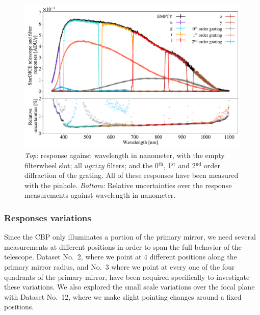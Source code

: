 \begin{figure}[h]
    \centering
    \includegraphics[width=\columnwidth]{fig/stardice_75um_response.pdf}
    \caption{\textit{Top}: \SD response against wavelength in nanometer, with the empty filterwheel slot; all $ugrizy$ filters; and the 0$^\mathrm{th}$, 1$^\mathrm{st}$ and 2$^\mathrm{nd}$ order diffraction of the grating. All of these responses have been measured with the \spinhole pinhole. \textit{Bottom:} Relative uncertainties over the \SD response measurements against wavelength in nanometer.}
    \label{fig:stardice_75um_response}
\end{figure}


\subsubsection{\SD Responses variations}

Since the CBP only illuminates a portion of the primary mirror, we need several measurements at different positions in order to span the full behavior of the \SD telescope. Dataset No.~2, where we point at 4 different positions along the primary mirror radius, and No.~3 where we point at every one of the four quadrants of the primary mirror, have been acquired specifically to investigate these variations. We also explored the small scale variations over the focal plane with Dataset No.~12, where we make slight pointing changes around a fixed positions.


